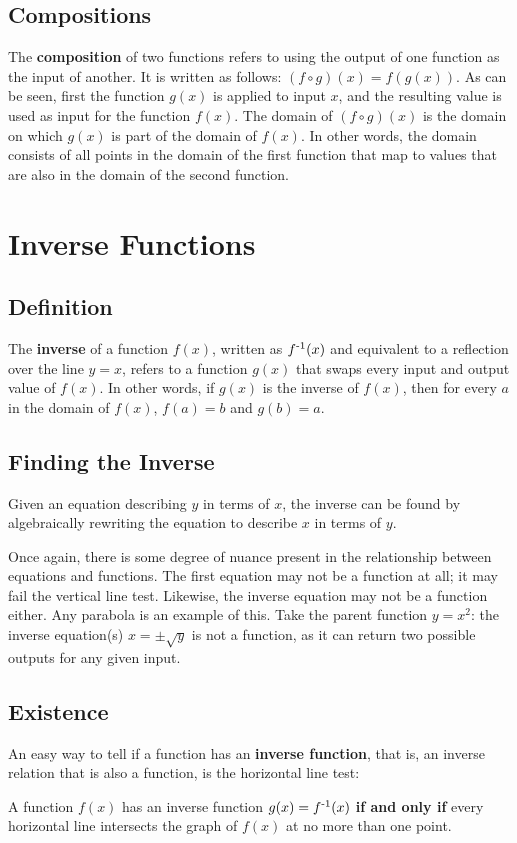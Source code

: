\documentclass{article}
\begin{document}
\subsection{Compositions}
The \textbf{composition} of two functions refers to using the output of one function as the input of another. It is written as follows: $(f \circ g)(x) = f(g(x))$. As can be seen, first the function $g(x)$ is applied to input $x$, and the resulting value is used as input for the function $f(x)$. The domain of $(f \circ g)(x)$ is the domain on which $g(x)$ is part of the domain of $f(x)$. In other words, the domain consists of all points in the domain of the first function that map to values that are also in the domain of the second function.

\section{Inverse Functions}

\subsection{Definition}
The \textbf{inverse} of a function $f(x)$, written as $f \textsuperscript{-1} (x)$ and equivalent to a reflection over the line $y=x$, refers to a function $g(x)$ that swaps every input and output value of $f(x)$. In other words, if $g(x)$ is the inverse of $f(x)$, then for every $a$ in the domain of $f(x)$, $f(a) = b$ and $g(b) = a$. 

\subsection{Finding the Inverse}
Given an equation describing $y$ in terms of $x$, the inverse can be found by algebraically rewriting the equation to describe $x$ in terms of $y$. 

Once again, there is some degree of nuance present in the relationship between equations and functions. The first equation may not be a function at all; it may fail the vertical line test. Likewise, the inverse equation may not be a function either. Any parabola is an example of this. Take the parent function $y=x^2$: the inverse equation(s) $x=\pm \sqrt{y}$ is not a function, as it can return two possible outputs for any given input.

\subsection{Existence}

An easy way to tell if a function has an \textbf{inverse function}, that is, an inverse relation that is also a function, is the horizontal line test:

A function $f(x)$ has an inverse function $g(x)=f \textsuperscript{-1} (x)$ \textbf{if and only if} every horizontal line intersects the graph of $f(x)$ at no more than one point. 
\end{document}
